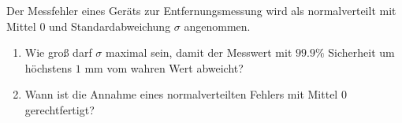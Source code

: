 
Der Messfehler eines Ger\"ats zur Entfernungsmessung wird als normalverteilt
mit Mittel $0$ und Standardabweichung $\sigma$ angenommen.

\begin{enumerate}[label=\alph*)]
 \item Wie gro{\ss} darf $\sigma$ maximal sein,
       damit der Messwert mit $99.9\%$ Sicherheit
       um h\"ochstens $1$ mm vom wahren Wert abweicht?
 \item Wann ist die Annahme eines normalverteilten Fehlers mit Mittel $0$
       gerechtfertigt?
\end{enumerate}



